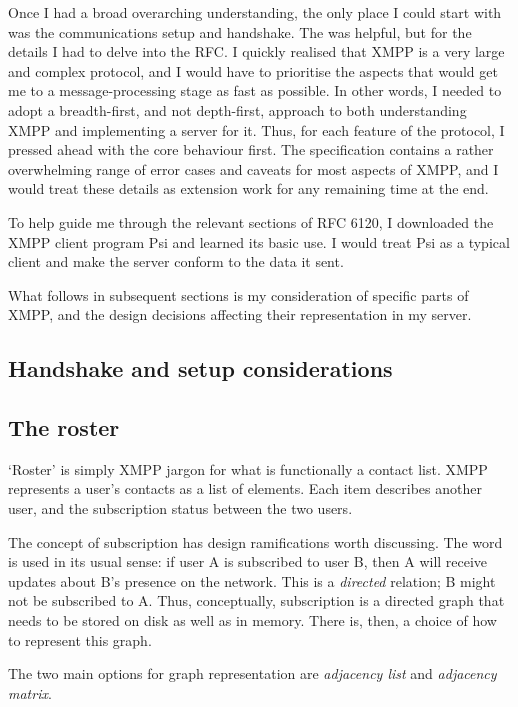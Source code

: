 \documentclass[12pt,a4paper,twoside,openright]{report}
\begin{document}
{Once I had a broad overarching understanding, the only place I could start with was the communications setup and handshake. The  was helpful, but for the details I had to delve into the RFC. I quickly realised that XMPP is a very large and complex protocol, and I would have to prioritise the aspects that would get me to a message-processing stage as fast as possible. In other words, I needed to adopt a breadth-first, and not depth-first, approach to both understanding XMPP and implementing a server for it. Thus, for each feature of the protocol, I pressed ahead with the core behaviour first. The specification contains a rather overwhelming range of error cases and caveats for most aspects of XMPP, and I would treat these details as extension work for any remaining time at the end.

To help guide me through the relevant sections of RFC 6120, I downloaded the XMPP client program Psi\cite{Psi-IM} and learned its basic use. I would treat Psi as a typical client and make the server conform to the data it sent.

What follows in subsequent sections is my consideration of specific parts of XMPP, and the design decisions affecting their representation in my server.

\subsection{Handshake and setup considerations}

\subsection{The roster}
`Roster' is simply XMPP jargon for what is functionally a contact list. XMPP represents a user's contacts as a list of  elements. Each item describes another user, and the subscription status between the two users.

The concept of subscription has design ramifications worth discussing. The word is used in its usual sense: if user A is subscribed to user B, then A will receive updates about B's presence on the network. This is a \emph{directed} relation; B might not be subscribed to A. Thus, conceptually, subscription is a directed graph that needs to be stored on disk as well as in memory. There is, then, a choice of how to represent this graph.

The two main options for graph representation are \emph{adjacency list} and \emph{adjacency matrix}.

}
\end{document}
